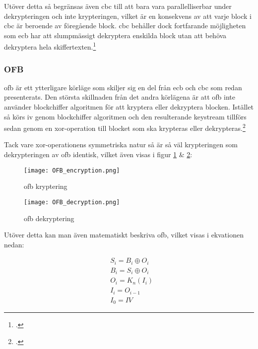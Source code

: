 Utöver detta så begränsas även \acrshort{cbc} till att bara vara parallelliserbar under
dekrypteringen och inte krypteringen, vilket är en konsekvens av att varje block i \acrshort{cbc}
är beroende av föregående block. \acrshort{cbc} behåller dock fortfarande möjligheten
som \acrshort{ecb} har att slumpmässigt dekryptera enskilda block utan att behöva
dekryptera hela skiffertexten.\footcite{modesofoperation}

\subsubsection{OFB}
\acrlong{ofb} är ett ytterligare körläge som skiljer sig en del från \acrshort{ecb}
och \acrshort{cbc} som  redan presenterats. Den största skillnaden från det andra
körlägena är att \acrshort{ofb} inte använder blockchiffer algoritmen för att kryptera
eller dekryptera blocken. Istället så körs \acrshort{iv} genom blockchiffer algoritmen
och den resulterande \gls{keystream} tillförs sedan genom en \gls{xor}-operation till
blocket som ska krypteras eller dekrypteras.\footcite{modesofoperation}

Tack vare \gls{xor}-operationens symmetriska natur så är så väl krypteringen som
dekrypteringen av \acrshort{ofb} identisk, vilket även visas i figur \ref{fig:ofb-mode-enc}
\& \ref{fig:ofb-mode-dec}:

\begin{figure}[H]
    \texttt{[image: OFB\_encryption.png]}
    \caption{\acrlong{ofb} kryptering \cite{ofb-mode-enc-ref}}
    \label{fig:ofb-mode-enc}
\end{figure}

\begin{figure}[H]
    \texttt{[image: OFB\_decryption.png]}
    \caption{\acrlong{ofb} dekryptering \cite{ofb-mode-dec-ref}}
    \label{fig:ofb-mode-dec}
\end{figure}

Utöver detta kan man även matematiskt beskriva \acrshort{ofb}, vilket visas i ekvationen
nedan:

\begin{equation}
    \label{eq:ofb-encryption}
    \begin{aligned}
        &S_i = B_i \oplus O_i\\\nonumber
        &B_i = S_i \oplus O_i\\
        &O_i = K_n(I_i)\\
        &I_i = O_{i-1}\\
        &I_0 = IV
    \end{aligned}
\end{equation}

